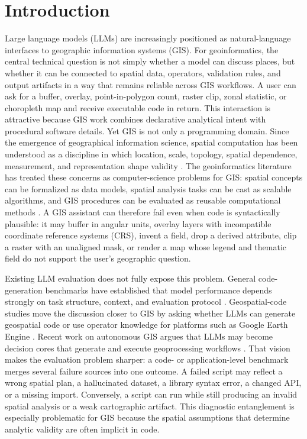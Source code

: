 \documentclass[12pt]{gsis}  %
\begin{document}
\section{Introduction}

Large language models (LLMs) are increasingly positioned as natural-language interfaces to geographic information systems (GIS). For geoinformatics, the central technical question is not simply whether a model can discuss places, but whether it can be connected to spatial data, operators, validation rules, and output artifacts in a way that remains reliable across GIS workflows. A user can ask for a buffer, overlay, point-in-polygon count, raster clip, zonal statistic, or choropleth map and receive executable code in return. This interaction is attractive because GIS work combines declarative analytical intent with procedural software details. Yet GIS is not only a programming domain. Since the emergence of geographical information science, spatial computation has been understood as a discipline in which location, scale, topology, spatial dependence, measurement, and representation shape validity \citep{Goodchild_1992,Tobler_1970,Anselin_1995,Janowicz_2019}. The geoinformatics literature has treated these concerns as computer-science problems for GIS: spatial concepts can be formalized as data models, spatial analysis tasks can be cast as scalable algorithms, and GIS procedures can be evaluated as reusable computational methods \citep{Shekhar_1999_ObjectDirection,Shekhar_2003_SpatialOutliers,Yoo_2005_InRouteNN,Camelli_2012_SeamlessSurfaces}. A GIS assistant can therefore fail even when code is syntactically plausible: it may buffer in angular units, overlay layers with incompatible coordinate reference systems (CRS), invent a field, drop a derived attribute, clip a raster with an unaligned mask, or render a map whose legend and thematic field do not support the user's geographic question.

Existing LLM evaluation does not fully expose this problem. General code-generation benchmarks have established that model performance depends strongly on task structure, context, and evaluation protocol \citep{Li_2022,Xu_2022,Du_2024,Ni_2024,Jiang_2026}. Geospatial-code studies move the discussion closer to GIS by asking whether LLMs can generate geospatial code or use operator knowledge for platforms such as Google Earth Engine \citep{Hou_2025_GeoCode,Hou_2025_GEEOPs}. Recent work on autonomous GIS argues that LLMs may become decision cores that generate and execute geoprocessing workflows \citep{Li_2025_AutonomousGIS}. That vision makes the evaluation problem sharper: a code- or application-level benchmark merges several failure sources into one outcome. A failed script may reflect a wrong spatial plan, a hallucinated dataset, a library syntax error, a changed API, or a missing import. Conversely, a script can run while still producing an invalid spatial analysis or a weak cartographic artifact. This diagnostic entanglement is especially problematic for GIS because the spatial assumptions that determine analytic validity are often implicit in code.
\end{document}
